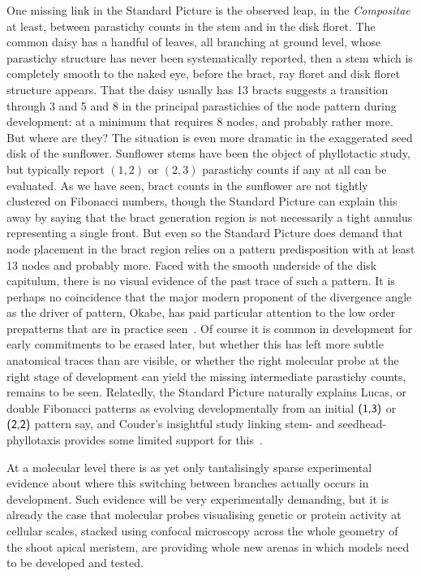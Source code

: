 One missing link in the Standard Picture is the observed leap, in the \textit{Compositae} at least, between parastichy counts in the stem and in the disk floret. The common daisy has a handful of leaves, all branching at ground level, whose parastichy structure has never been systematically reported, then a stem which is completely smooth to the naked eye, before the bract, ray floret and disk floret structure appears. That the daisy usually has 13 bracts suggests a transition through 3 and 5 and 8 in the principal parastichies of the node pattern during development: at a minimum that requires 8 nodes, and probably rather more. But where are they? The situation is even more dramatic in the exaggerated seed disk of the sunflower. Sunflower stems have been the object of phyllotactic study, but typically report $(1,2)$ or $(2,3)$ parastichy counts if any at all can be evaluated. As we have seen, bract counts in the sunflower are not tightly clustered on Fibonacci numbers, though the Standard Picture can explain this away by saying that the bract generation region is not necessarily a tight annulus representing a single front. But even so the Standard Picture does demand that node placement in the bract region relies on a pattern predisposition with at least 13 nodes and probably more. Faced with the smooth underside of the disk capitulum, there is no visual evidence of the past trace of such a pattern. It is perhaps no coincidence that the major modern  proponent of the divergence angle as the driver of pattern, Okabe, has paid particular attention to the low order prepatterns that are in practice seen~\autocite{okabeBiophysicalOptimalityGolden2015}. Of course it is common in development for early commitments to be erased later, but whether this has left more subtle anatomical traces than are visible, or whether the right molecular probe at the right stage of development can yield the missing intermediate parastichy counts, remains to be seen. 
  Relatedly, the Standard Picture naturally explains Lucas, or double Fibonacci patterns as evolving developmentally from an initial $\textsf{(1,3)}$ or $\textsf{(2,2)}$ pattern say,
  and  Couder's insightful study linking stem- and seedhead-phyllotaxis provides some limited support for this~\cite{couderInitialTransitionsOrder1998}. 
  
   At a molecular level there is as yet only tantalisingly sparse experimental evidence about where this switching between branches actually occurs in development. Such evidence will be very experimentally demanding, but it is already the case that molecular probes visualising genetic or protein activity at cellular scales, stacked using confocal microscopy across the whole geometry of the shoot apical meristem, are providing whole new arenas in which models need to be developed and tested. 
